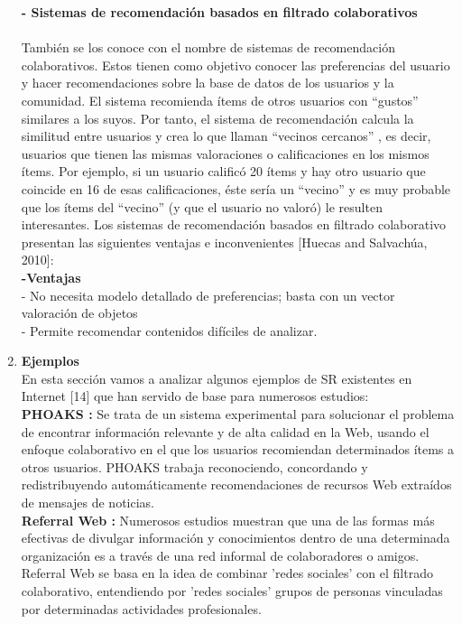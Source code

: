 \begin{enumerate}
    
    \textbf{- Sistemas de recomendación basados en filtrado colaborativos}\\\\
    También se los conoce con el nombre de sistemas de recomendación colaborativos. Estos tienen como objetivo conocer las preferencias del usuario y hacer recomendaciones sobre la base de datos de los usuarios y la comunidad. El sistema recomienda ítems de otros usuarios con “gustos” similares a los suyos. Por tanto, el sistema de recomendación calcula la similitud entre usuarios y crea lo que llaman “vecinos cercanos” , es decir, usuarios que tienen las mismas valoraciones o calificaciones en los mismos ítems. Por ejemplo, si un usuario calificó 20 ítems y hay otro usuario que coincide en 16 de esas calificaciones, éste sería un “vecino” y es muy probable que los ítems del “vecino” (y que el usuario no valoró) le resulten interesantes. Los sistemas de recomendación basados en filtrado colaborativo presentan las siguientes ventajas e inconvenientes [Huecas and Salvachúa, 2010]:\\
    \textbf{-Ventajas}\\
    - No necesita modelo detallado de preferencias; basta con un vector valoración de objetos\\
    - Permite recomendar contenidos difíciles de analizar.

    
    
    
    \item \textbf {Ejemplos}\\
    En esta sección vamos a analizar algunos ejemplos de SR existentes en Internet [14] que han servido de base para numerosos estudios:\\
    
    \textbf{PHOAKS :} Se trata de un sistema experimental para solucionar el problema de encontrar información relevante y de alta calidad en la Web, usando el enfoque colaborativo en el que los usuarios recomiendan determinados ítems a otros usuarios. PHOAKS trabaja reconociendo, concordando y redistribuyendo automáticamente recomendaciones de recursos Web extraídos de mensajes de noticias.\\
    
    \textbf{Referral Web :} Numerosos estudios muestran que una de las formas más efectivas de divulgar información y conocimientos dentro de una determinada organización es a través de una red informal de colaboradores o amigos. Referral Web se basa en la idea de combinar 'redes sociales' con el filtrado colaborativo, entendiendo por 'redes sociales' grupos de personas vinculadas por determinadas actividades profesionales.\\
    

\end{enumerate}
